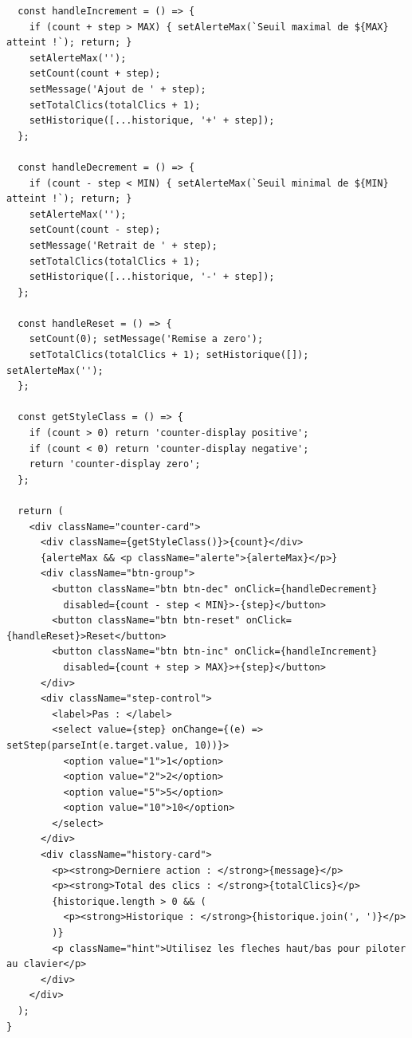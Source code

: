 \documentclass[12pt, a4paper]{article}
\begin{document}
\begin{lstlisting}
  const handleIncrement = () => {
    if (count + step > MAX) { setAlerteMax(`Seuil maximal de ${MAX} atteint !`); return; }
    setAlerteMax('');
    setCount(count + step);
    setMessage('Ajout de ' + step);
    setTotalClics(totalClics + 1);
    setHistorique([...historique, '+' + step]);
  };

  const handleDecrement = () => {
    if (count - step < MIN) { setAlerteMax(`Seuil minimal de ${MIN} atteint !`); return; }
    setAlerteMax('');
    setCount(count - step);
    setMessage('Retrait de ' + step);
    setTotalClics(totalClics + 1);
    setHistorique([...historique, '-' + step]);
  };

  const handleReset = () => {
    setCount(0); setMessage('Remise a zero');
    setTotalClics(totalClics + 1); setHistorique([]); setAlerteMax('');
  };

  const getStyleClass = () => {
    if (count > 0) return 'counter-display positive';
    if (count < 0) return 'counter-display negative';
    return 'counter-display zero';
  };

  return (
    <div className="counter-card">
      <div className={getStyleClass()}>{count}</div>
      {alerteMax && <p className="alerte">{alerteMax}</p>}
      <div className="btn-group">
        <button className="btn btn-dec" onClick={handleDecrement}
          disabled={count - step < MIN}>-{step}</button>
        <button className="btn btn-reset" onClick={handleReset}>Reset</button>
        <button className="btn btn-inc" onClick={handleIncrement}
          disabled={count + step > MAX}>+{step}</button>
      </div>
      <div className="step-control">
        <label>Pas : </label>
        <select value={step} onChange={(e) => setStep(parseInt(e.target.value, 10))}>
          <option value="1">1</option>
          <option value="2">2</option>
          <option value="5">5</option>
          <option value="10">10</option>
        </select>
      </div>
      <div className="history-card">
        <p><strong>Derniere action : </strong>{message}</p>
        <p><strong>Total des clics : </strong>{totalClics}</p>
        {historique.length > 0 && (
          <p><strong>Historique : </strong>{historique.join(', ')}</p>
        )}
        <p className="hint">Utilisez les fleches haut/bas pour piloter au clavier</p>
      </div>
    </div>
  );
}
\end{lstlisting}
\end{document}
